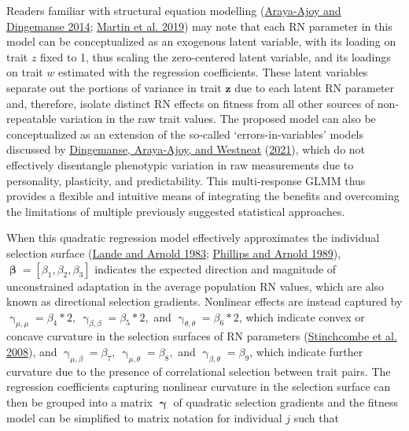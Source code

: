 \documentclass{article}
\begin{document}
Readers familiar with structural equation modelling
(\protect\hyperlink{ref-Araya2014}{Araya-Ajoy and Dingemanse 2014};
\protect\hyperlink{ref-Martin2019}{Martin et al. 2019}) may note that
each RN parameter in this model can be conceptualized as an exogenous
latent variable, with its loading on trait \(z\) fixed to 1, thus
scaling the zero-centered latent variable, and its loadings on trait
\(w\) estimated with the regression coefficients. These latent variables
separate out the portions of variance in trait \(\boldsymbol{z}\) due to
each latent RN parameter and, therefore, isolate distinct RN effects on
fitness from all other sources of non-repeatable variation in the raw
trait values. The proposed model can also be conceptualized as an
extension of the so-called `errors-in-variables' models discussed by
\protect\hyperlink{ref-Ding2021}{Dingemanse, Araya‐Ajoy, and Westneat}
(\protect\hyperlink{ref-Ding2021}{2021}), which do not effectively
disentangle phenotypic variation in raw measurements due to personality,
plasticity, and predictability. This multi-response GLMM thus provides a
flexible and intuitive means of integrating the benefits and overcoming
the limitations of multiple previously suggested statistical approaches.

When this quadratic regression model effectively approximates the
individual selection surface (\protect\hyperlink{ref-Lande1983}{Lande
and Arnold 1983}; \protect\hyperlink{ref-Phillips1989}{Phillips and
Arnold 1989}),
\(\boldsymbol{\upbeta}=\left[\beta_1,\beta_2,\beta_3 \right]\) indicates
the expected direction and magnitude of unconstrained adaptation in the
average population RN values, which are also known as directional
selection gradients. Nonlinear effects are instead captured by
\(\upgamma _{\mu,\mu}=\beta_4*2, \ \upgamma _{\beta,\beta}= \beta_5*2,\)
and \(\upgamma _{\theta,\theta}= \beta_6*2\), which indicate convex or
concave curvature in the selection surfaces of RN parameters
(\protect\hyperlink{ref-Stinch2008}{Stinchcombe et al. 2008}), and
\(\upgamma _{\mu,\beta}=\beta_7, \ \upgamma _{\mu,\theta}=\beta_8,\) and
\(\upgamma _{\beta,\theta}=\beta_9\), which indicate further curvature
due to the presence of correlational selection between trait pairs. The
regression coefficients capturing nonlinear curvature in the selection
surface can then be grouped into a matrix \(\boldsymbol{\upgamma}\) of
quadratic selection gradients and the fitness model can be simplified to
matrix notation for individual \(j\) such that
\end{document}
